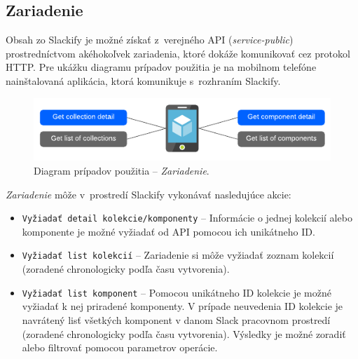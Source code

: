 \subsection{Zariadenie}
Obsah zo Slackify je možné získať z~verejného API (\emph{service-public}) prostredníctvom akéhokoľvek zariadenia, ktoré dokáže komunikovať cez protokol HTTP. Pre ukážku diagramu prípadov použitia je na mobilnom telefóne nainštalovaná aplikácia, ktorá komunikuje s~rozhraním Slackify.

\begin{figure}[h]
	\centering
	\includegraphics[scale=1.4]{obrazky-figures/device_user_case}
	\caption{Diagram prípadov použitia -- \emph{Zariadenie}.}
\end{figure}

\noindent \emph{Zariadenie} môže v~prostredí Slackify vykonávať nasledujúce akcie:

\begin{itemize}
	\item \texttt{Vyžiadať detail kolekcie/komponenty} -- Informácie o jednej kolekcií alebo komponente je možné vyžiadať od API pomocou ich unikátneho ID.
	\item \texttt{Vyžiadať list kolekcií} -- Zariadenie si môže vyžiadať zoznam kolekcií (zoradené chronologicky podľa času vytvorenia).
	\item \texttt{Vyžiadať list komponent} -- Pomocou unikátneho ID kolekcie je možné vyžiadať k nej priradené komponenty. V prípade neuvedenia ID kolekcie je navrátený lisť všetkých komponent v danom Slack pracovnom prostredí (zoradené chronologicky podľa času vytvorenia). Výsledky je možné zoradiť alebo filtrovať pomocou parametrov operácie.
\end{itemize}
